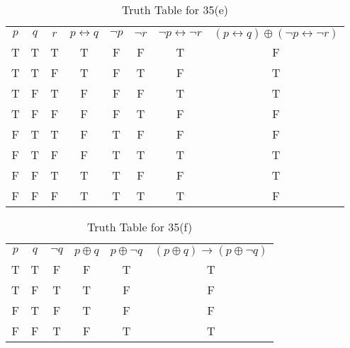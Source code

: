 \documentclass{Axon}
\begin{document}
\begin{table}[ht]
    \centering
    \begin{tabular}{c|c|c|c|c|c|c|c}
        \(p\) & \(q\) & \(r\) & \(p \leftrightarrow q\) & \(\lnot p\) & \(\lnot r\) & \(\lnot p \leftrightarrow \lnot r\) & \((p \leftrightarrow q) \oplus (\lnot p \leftrightarrow \lnot r)\) \\
        T     & T     & T     & T                       & F           & F           & T                                   & F                                                                  \\
        T     & T     & F     & T                       & F           & T           & F                                   & T                                                                  \\
        T     & F     & T     & F                       & F           & F           & T                                   & T                                                                  \\
        T     & F     & F     & F                       & F           & T           & F                                   & F                                                                  \\
        F     & T     & T     & F                       & T           & F           & F                                   & F                                                                  \\
        F     & T     & F     & F                       & T           & T           & T                                   & T                                                                  \\
        F     & F     & T     & T                       & T           & F           & F                                   & T                                                                  \\
        F     & F     & F     & T                       & T           & T           & T                                   & F
    \end{tabular}
    \caption{Truth Table for 35(e)}
\end{table}

\begin{table}[ht]
    \centering
    \begin{tabular}{c|c|c|c|c|c}
        \(p\) & \(q\) & \(\lnot q\) & \(p \oplus q\) & \(p \oplus \lnot q\) & \((p \oplus q) \to (p \oplus \lnot q)\) \\
        T     & T     & F           & F              & T                    & T                                       \\
        T     & F     & T           & T              & F                    & F                                       \\
        F     & T     & F           & T              & F                    & F                                       \\
        F     & F     & T           & F              & T                    & T
    \end{tabular}
    \caption{Truth Table for 35(f)}
\end{table}
\end{document}
